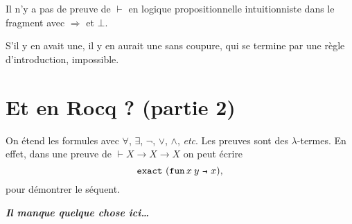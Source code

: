 \documentclass[./main]{subfiles}
\begin{document}
  \begin{crlr}
    Il n'y a pas de preuve de $\vdash$ en logique propositionnelle intuitionniste dans le fragment avec $\Rightarrow$ et  $\bot$.
  \end{crlr}
  \begin{prv}
    S'il y en avait une, il y en aurait une sans coupure, qui se termine par une règle d'introduction, impossible.
  \end{prv}

  \section{Et en Rocq ? (partie 2)}

  On étend les formules avec $\forall$, $\exists$, $\lnot$, $\lor$, $\land$, \textit{etc}.
  Les preuves sont des $\lambda$-termes.
  En effet, dans une preuve de $\vdash X \to X \to X$ on peut écrire \[
    \mathtt{exact}\ (\fun{x\: y}{x})
  ,\]
  pour démontrer le séquent.

  \textbf{\textit{Il manque quelque chose ici\ldots}}
\end{document}

